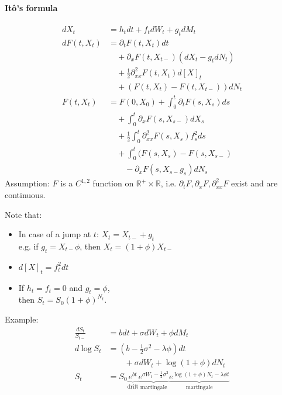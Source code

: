 \documentclass[a4paper,landscape,8pt,fleqn]{scrartcl}
\begin{document}
\begin{multicols*}{4}
\paragraph{Itô's formula}
\begin{align*}
dX_t &= h_t dt + f_t dW_t + g_t dM_t \\
dF(t,X_t) &= \partial_t F(t,X_t) dt \\
&\quad + \partial_x F(t,X_{t-}) (dX_t - g_t dN_t) \\
&\quad + \frac{1}{2} \partial^2_{xx} F(t,X_t) d[X]_t \\
&\quad + \left( F(t,X_t) - F(t,X_{t-}) \right) dN_t \\
F(t,X_t) &= F(0,X_0) + \int_0^t \partial_t F(s,X_s) ds \\
&\quad + \int_0^t \partial_x F(s,X_{s-}) dX_s \\
&\quad + \frac{1}{2} \int_0^t \partial^2_{xx} F(s,X_s) f_s^2 ds \\
&\quad + \int_0^t (F(s,X_s) - F(s,X_{s-}) \\
&\qquad - \partial_x F(s,X_{s-} g_s) dN_s
\end{align*}
Assumption: $F$ is a $C^{1,2}$ function on $\mathbb{R}^+ \times \mathbb{R}$, i.e. $\partial_t F, \partial_x F, \partial^2_{xx} F$ exist and are continuous.

Note that:
\begin{itemize}
\item In case of a jump at $t$: $X_t = X_{t-} + g_t$ \\
e.g. if $g_t = X_{t-} \phi$, then $X_t = (1+\phi) X_{t-}$
\item $d[X]_t = f_t^2 dt$
\item If $h_t = f_t = 0$ and $g_t = \phi$, \\
then $S_t = S_0 (1 + \phi)^{N_t}$.
\end{itemize}
Example:
\begin{align*}
\frac{dS_t}{S_{t-}} &= b dt + \sigma dW_t + \phi dM_t \\
d \log S_t &= \left( b - \frac{1}{2} \sigma^2 - \lambda \phi \right) dt \\
& \qquad + \sigma dW_t + \log(1+\phi) dN_t \\
S_t &= S_0 \underbrace{e^{b t}}_\text{drift} \underbrace{e^{\sigma W_t - \frac{1}{2} \sigma^2}}_\text{martingale} \underbrace{e^{\log(1+\phi) N_t - \lambda \phi t}}_\text{martingale}
\end{align*}


\end{multicols*}
\end{document}
